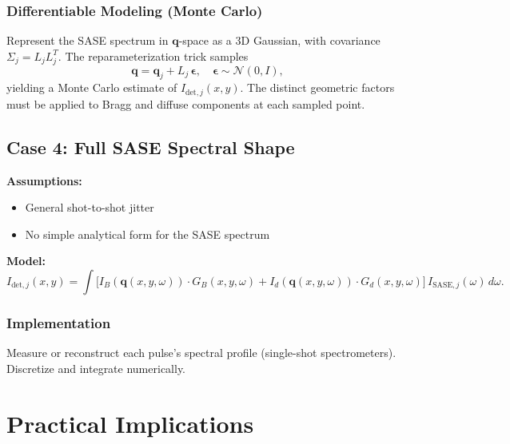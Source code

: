 \documentclass[12pt,a4paper]{article}
\begin{document}
\subsubsection*{Differentiable Modeling (Monte Carlo)}
Represent the SASE spectrum in $\mathbf{q}$-space as a 3D Gaussian, with covariance $\Sigma_j = L_j L_j^{T}$. The reparameterization trick samples
\[
\mathbf{q} = \mathbf{q}_j + L_j\,\boldsymbol{\epsilon}, \quad \boldsymbol{\epsilon} \sim \mathcal{N}(0,I),
\]
yielding a Monte Carlo estimate of $I_{\text{det},j}(x,y)$. The distinct geometric factors must be applied to Bragg and diffuse components at each sampled point.

\subsection{Case 4: Full SASE Spectral Shape}
\textbf{Assumptions:}
\begin{itemize}
\item General shot-to-shot jitter
\item No simple analytical form for the SASE spectrum
\end{itemize}
\textbf{Model:}
\begin{equation}
I_{\text{det},j}(x,y) = \int \bigl[I_B(\mathbf{q}(x,y,\omega)) \cdot G_B(x,y,\omega) + I_d(\mathbf{q}(x,y,\omega)) \cdot G_d(x,y,\omega)\bigr]\,
I_{\text{SASE},j}(\omega)\,d\omega.
\end{equation}

\subsubsection*{Implementation}
Measure or reconstruct each pulse's spectral profile (single-shot spectrometers). Discretize and integrate numerically.

\section{Practical Implications}
\end{document}
